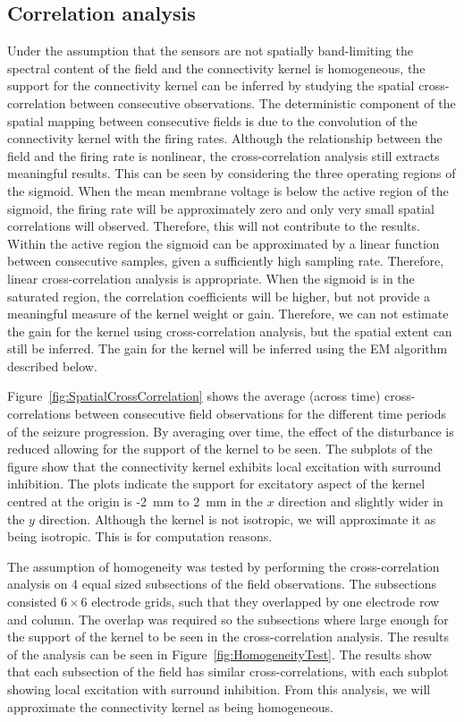 \documentclass[]{article}
\begin{document}
\subsection{Correlation analysis}\label{subsec:CorrAnal}
Under the assumption that the sensors are not spatially band-limiting the spectral content of the field and the connectivity kernel is homogeneous, the support for the connectivity kernel can be inferred by studying the spatial cross-correlation between consecutive observations. The deterministic component of the spatial mapping between consecutive fields is due to the convolution of the connectivity kernel with the firing rates. Although the relationship between the field and the firing rate is nonlinear, the cross-correlation analysis still extracts meaningful results. This can be seen by considering the three operating regions of the sigmoid. When the mean membrane voltage is below the active region of the sigmoid, the firing rate will be approximately zero and only very small spatial correlations will observed. Therefore, this will not contribute to the results. Within the active region the sigmoid can be approximated by a linear function between consecutive samples, given a sufficiently high sampling rate. Therefore, linear cross-correlation analysis is appropriate. When the sigmoid is in the saturated region, the correlation coefficients will be higher, but not provide a meaningful measure of the kernel weight or gain. Therefore, we can not estimate the gain for the kernel using cross-correlation analysis, but the spatial extent can still be inferred. The gain for the kernel will be inferred using the EM algorithm described below.

Figure~\ref{fig:SpatialCrossCorrelation} shows the average (across time) cross-correlations between consecutive field observations for the different time periods of the seizure progression. By averaging over time, the effect of the disturbance is reduced allowing for the support of the kernel to be seen. The subplots of the figure show that the connectivity kernel exhibits local excitation with surround inhibition. The plots indicate the support for excitatory aspect of the kernel centred at the origin is -2~mm to 2~mm in the $x$ direction and slightly wider in the $y$ direction. Although the kernel is not isotropic, we will approximate it as being isotropic. This is for computation reasons.

The assumption of homogeneity was tested by performing the cross-correlation analysis on 4 equal sized subsections of the field observations. The subsections consisted $6\times6$ electrode grids, such that they overlapped by one electrode row and column. The overlap was required so the subsections where large enough for the support of the kernel to be seen in the cross-correlation analysis. The results of the analysis can be seen in Figure~\ref{fig:HomogeneityTest}. The results show that each subsection of the field has similar cross-correlations, with each subplot showing local excitation with surround inhibition. From this analysis, we will approximate the connectivity kernel as being homogeneous.
\end{document}
